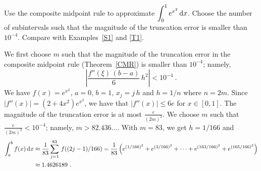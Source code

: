\begin{egg}
Use the composite midpoint rule to approximate
$\displaystyle \int_0^1 e^{x^2}\,\mathrm{d}x$.
Choose the number of subintervals such that the magnitude of the
truncation error is smaller than $10^{-4}$.  Compare with
Examples~\ref{S1} and \ref{T1}.

We first choose $m$ such that the magnitude of the truncation error in
the composite midpoint rule (Theorem~\ref{CMR}) is smaller than
$10^{-4}$; namely,
\[
\left| \frac{f''(\xi)\,(b-a)}{6}\,h^2 \right| < 10^{-4}  \ .
\]
We have $\displaystyle f(x)=e^{x^2}$, $a=0$, $b=1$, $x_j = j\,h$ and
$h = 1/n$ where $n=2m$.  Since
$\displaystyle |f''(x)|=(2+4x^2)e^{x^2}$, we have that
$|f''(x)|\leq 6e$ for $x \in [0,1]$.  The magnitude of the
truncation error is at most $\displaystyle \frac{e}{(2m)^2}$.  We
choose $m$ such that $\displaystyle \frac{e}{(2m)^2} < 10^{-4}$;
namely, $m > 82.436\ldots$.  With $m=83$, we get $h=1/166$
and
\begin{align*}
\int_{a}^{b} f(x)\,\mathrm{d}x
&\approx \frac{1}{83} \sum_{j=1}^{83}\,f((2j-1)/166)
= \frac{1}{83} \left( e^{(1/166)^2} + e^{(3/166)^2} + \dots
+e^{(163/166)^2}+e^{(165/166)^2} \right) \\
& \approx 1.4626189 \ .
\end{align*}
\end{egg}

